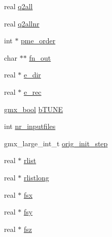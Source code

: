 \begin{DoxyCompactItemize}
\item 
real \hyperlink{structt__inputinfo_a6d42a28ed89eab066ea78ef2214cc031}{q2all}
\item 
real \hyperlink{structt__inputinfo_a97bd2af44a7a9877ef7b2c21b81edd7f}{q2allnr}
\item 
int $\ast$ \hyperlink{structt__inputinfo_ab53b026f70243f52c9a14ef91174b7fe}{pme\-\_\-order}
\item 
char $\ast$$\ast$ \hyperlink{structt__inputinfo_adce1ec0d3c68a3975d2fef9cd909c23a}{fn\-\_\-out}
\item 
real $\ast$ \hyperlink{structt__inputinfo_a21ae6c6db9063c71dbcff4479bba0cd3}{e\-\_\-dir}
\item 
real $\ast$ \hyperlink{structt__inputinfo_a96c3b2b6ab3b4564ab8877625b1f50cf}{e\-\_\-rec}
\item 
\hyperlink{include_2types_2simple_8h_a8fddad319f226e856400d190198d5151}{gmx\-\_\-bool} \hyperlink{structt__inputinfo_a80ac246cb3ca8122b0c34f0956a96e8b}{b\-T\-U\-N\-E}
\item 
int \hyperlink{structt__inputinfo_a0d2bdec7504274d1d8b764abb19841f8}{nr\-\_\-inputfiles}
\item 
gmx\-\_\-large\-\_\-int\-\_\-t \hyperlink{structt__inputinfo_af5b29c784dceb3379a5f125bd39b0b48}{orig\-\_\-init\-\_\-step}
\item 
real $\ast$ \hyperlink{structt__inputinfo_a0a77fbb9f65669f7ca3d68ba1d7c007a}{rlist}
\item 
real $\ast$ \hyperlink{structt__inputinfo_a15dcd01e542c31bb14d0e84530e969e8}{rlistlong}
\item 
real $\ast$ \hyperlink{structt__inputinfo_ae8e680193b005210e20d369619c7e27a}{fsx}
\item 
real $\ast$ \hyperlink{structt__inputinfo_af83511a161c481c9aadbd38d93aa32cd}{fsy}
\item 
real $\ast$ \hyperlink{structt__inputinfo_ae844e8117a16b8d09ef6afa0fab0e605}{fsz}
\end{DoxyCompactItemize}


